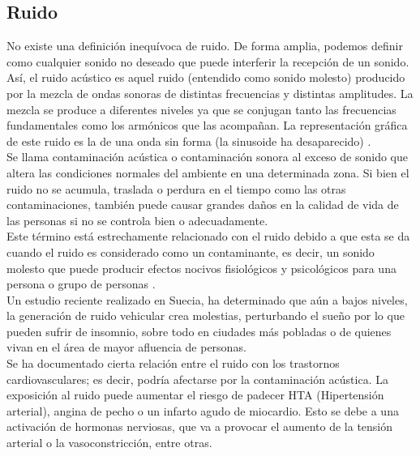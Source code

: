\documentclass[letter,11pt]{article}
\begin{document}
\subsection{Ruido}

No existe una definición inequívoca de ruido. De forma amplia, podemos definir
como cualquier sonido no deseado que puede interferir la recepción de un sonido.
\\

Así, el ruido acústico es aquel ruido (entendido como sonido molesto) producido
por la mezcla de ondas sonoras de distintas frecuencias y distintas amplitudes.
La mezcla se produce a diferentes niveles ya que se conjugan tanto las
frecuencias fundamentales como los armónicos que las acompañan. La
representación gráfica de este ruido es la de una onda sin forma (la sinusoide
ha desaparecido) \cite{WIKI2}.
\\

Se llama contaminación acústica o contaminación sonora al exceso de sonido que
altera las condiciones normales del ambiente en una determinada zona. Si bien
el ruido no se acumula, traslada o perdura en el tiempo como las otras
contaminaciones, también puede causar grandes daños en la calidad de vida de
las personas si no se controla bien o adecuadamente.
\\

Este término está estrechamente relacionado con el ruido debido a que esta se da
cuando el ruido es considerado como un contaminante, es decir, un sonido molesto
que puede producir efectos nocivos fisiológicos y psicológicos para una persona
o grupo de personas \cite{WIKI3}.
\\

Un estudio reciente realizado en Suecia, ha determinado que aún a bajos niveles,
la generación de ruido vehicular crea molestias, perturbando el sueño por lo que
pueden sufrir de insomnio, sobre todo en ciudades más pobladas o de quienes
vivan en el área de mayor afluencia de personas.
\\

Se ha documentado cierta relación entre el ruido con los trastornos
cardiovasculares; es decir, podría afectarse por la contaminación acústica. La
exposición al ruido puede aumentar el riesgo de padecer HTA (Hipertensión
arterial), angina de pecho o un infarto agudo de miocardio. Esto se debe a una
activación de hormonas nerviosas, que va a provocar el aumento de la tensión
arterial o la vasoconstricción, entre otras.
\\
\end{document}

